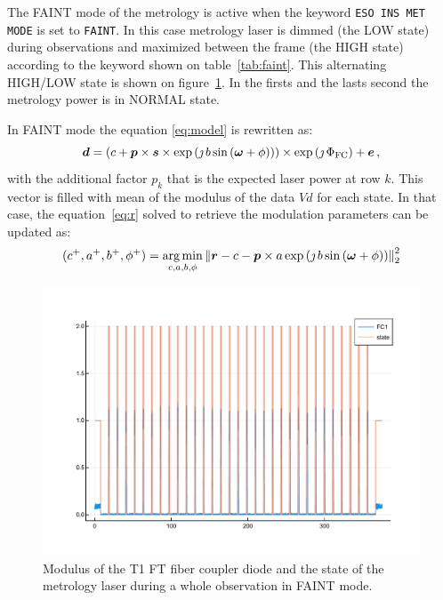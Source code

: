 \documentclass[a4paper,11pt,twoside]{scrartcl}
\begin{document}
The FAINT mode of the metrology is active when the keyword \verb|ESO INS MET MODE| is set to \verb|FAINT|. In this case metrology laser is dimmed (the LOW state) during observations and maximized between the frame (the HIGH state) according to the keyword shown on table~\ref{tab:faint}.  This alternating HIGH/LOW state is shown on figure~\ref{fig:faint}. In the firsts and the lasts second the metrology power is in NORMAL state.

In FAINT mode the equation \ref{eq:model} is rewritten as:
\begin{equation}
    \boldsymbol{d} = \left( c + \boldsymbol{p} \times  \boldsymbol{s} \times  \exp\left( \jmath \, b \sin\left( \boldsymbol{\omega} + \phi\right)\right)\right)\times\exp\left(\jmath\,\Phi_\textrm{FC}\right)+  \boldsymbol{e}\,,\label{eq:modelfaint}
\end{equation}
with the additional factor $p_k$ that is the expected laser power at row $k$. This vector is filled with   mean of the modulus of the data $V{d}$  for each state. In that case, the equation~\ref{eq:r} solved to retrieve the modulation parameters can be updated   as:
\begin{equation}
    (c^+, a^+, b^+, \phi^+) = \argmin_{c,a,b,\phi} \Norm{\V{r} -  c - \V{p} \times a \exp\left( \jmath \, b \sin\left( \V{\omega} + \phi\right)\right) }_2^2\label{eq:rfaint}
\end{equation}



\begin{figure}
    \centering
    \includegraphics[width=0.8\linewidth]{figs/FaintStates.pdf}
    \caption{Modulus of the T1 FT fiber coupler diode and the state of the metrology laser during a whole observation in FAINT mode.}
    \label{fig:faint}
\end{figure}
\end{document}
